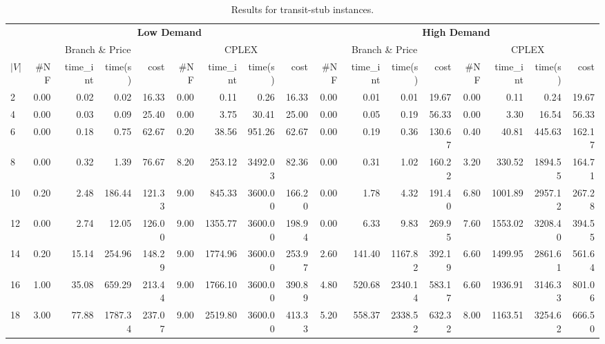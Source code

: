 \documentclass[conference]{IEEEtran}
\begin{document}
\begin{table*}[h]
\begin{center}
\caption{Results for transit-stub instances.}\label{tab:ts}
\begin{tabular} {l | r r r r | r r r r | r r r r | r r r r }
\hline
      &  \multicolumn{8}{c|}{ \textbf{Low Demand} } & \multicolumn{8}{c}{ \textbf{High Demand}} \\
      &  \multicolumn{4}{c|}{Branch \& Price} & \multicolumn{4}{c|}{CPLEX}    &       \multicolumn{4}{c|}{Branch \& Price} & \multicolumn{4}{c}{CPLEX}               \\  
$|V|$ & \#NF &  time\_int    &  time(s)       &  cost          &  \#NF &  time\_int  &  time(s)       &  cost  & \#NF &  time\_int    &  time(s)       &  cost          &  \#NF &  time\_int  &  time(s)       &  cost \\
\hline      
2&      0.00  &   0.02    &   0.02     &   16.33     & 0.00 & 0.11 & 0.26 & 16.33                &   0.00  &   0.01    &   0.01     &   19.67    & 0.00 & 0.11 & 0.24 & 19.67                  \\  
4&      0.00  &   0.03    &   0.09     &   25.40     & 0.00 & 3.75 & 30.41 & 25.00               &   0.00  &   0.05    &   0.19     &   56.33     & 0.00 & 3.30 & 16.54 & 56.33                 \\
6&      0.00  &   0.18    &   0.75     &   62.67     & 0.20 & 38.56 & 951.26 & 62.67             &   0.00  &   0.19    &   0.36     &   130.67   & 0.40 & 40.81 & 445.63 & 162.17           \\
8&      0.00  &   0.32    &   1.39     &   76.67     & 8.20 & 253.12 & 3492.03 & 82.36          &   0.00  &   0.31    &   1.02     &   160.22   & 3.20 & 330.52 & 1894.55 & 164.71           \\
10&     0.20  &   2.48    &   186.44   &   121.33    & 9.00 & 845.33 & 3600.00 & 166.20       &   0.00  &   1.78    &   4.32     &   191.40   & 6.80 & 1001.89 & 2957.12 & 267.28        \\
12&     0.00  &   2.74    &   12.05    &   126.00    & 9.00 & 1355.77 & 3600.00 & 198.94     &   0.00  &   6.33    &   9.83     &   269.95    & 7.60 & 1553.02 & 3208.40 & 394.55      \\
14&     0.20  &   15.14   &   254.96   &   148.29    & 9.00 & 1774.96 & 3600.00 & 253.97    &   2.60  &   141.40  &   1167.82  &   392.19   & 6.60 & 1499.95 & 2861.61 & 561.64     \\
16&     1.00  &   35.08   &   659.29   &   213.44    & 9.00 & 1766.10 & 3600.00 & 390.89    &   4.80  &   520.68  &   2340.14  &   583.17   & 6.60 & 1936.91 & 3146.33 & 801.06     \\
18&     3.00  &   77.88   &   1787.34  &   237.07    & 9.00 & 2519.80 & 3600.00 & 413.33    &   5.20  &   558.37  &   2338.52  &   632.32   & 8.00 & 1163.51 & 3254.62 & 666.50     \\ 
\hline
\end{tabular} 
\end{center}
\end{table*}
\end{document}
